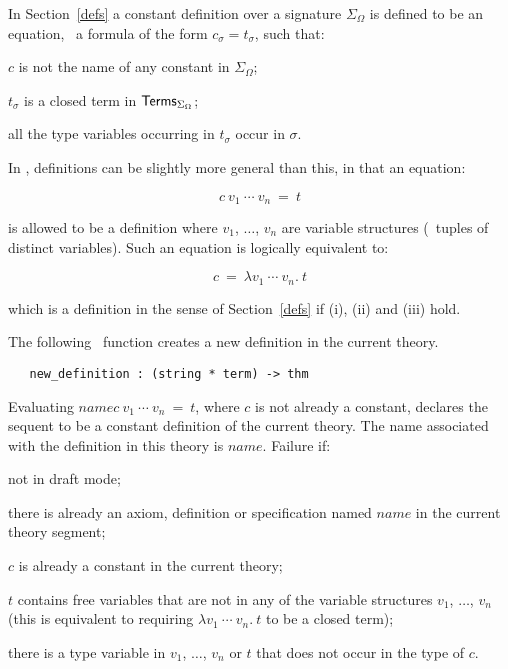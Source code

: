 In Section~\ref{defs} a constant definition
over a signature $\Sigma_{\Omega}$ is defined to be
an equation, \ie\ a formula of the form $c_{\sigma}=t_{\sigma}$,
such that:
\begin{myenumerate}
\item $c$ is not the name of any constant in $\Sigma_{\Omega}$;
\item $t_{\sigma}$ is a closed term in ${\sf Terms}_{\Sigma_{\Omega}}$;
\item all the type variables occurring in $t_{\sigma}$ occur in $\sigma$.
\end{myenumerate}

In \HOL, definitions can be slightly more general than this, in that
an equation:

\[ c\ v_1\ \cdots\ v_n\ =\ t \]

\noindent is  allowed  to  be a  definition where  $v_1$, $\dots$, $v_n$ are
variable structures (\ie\ tuples of distinct variables).   Such  an equation is
logically equivalent to:

\[ c\ =\ \lambda v_1\ \cdots\ v_n.\  t \]

\noindent which is a definition in the sense of  Section~\ref{defs} if (i),
(ii) and (iii) hold.

The following  \ML\ function  creates a  new definition in
the current theory.

\begin{boxed}
\begin{verbatim}
   new_definition : (string * term) -> thm
\end{verbatim}\end{boxed}


\noindent Evaluating
 $name$$c\ v_1\ \cdots\ v_n\ =\ t$,
where $c$ is not already a constant, declares the sequent
 to be a constant definition
of the current theory. The name associated with the definition in
this theory is $name$.
Failure if:
\begin{myenumerate}
\item not in draft mode;
\item there is already an axiom, definition or specification
named $name$ in the current theory segment;
\item $c$ is already a constant in the current theory;
\item $t$ contains free variables that are not in any of
the variable structures $v_1$, $\dots$, $v_n$ (this is equivalent
to requiring $\lambda v_1\ \cdots\ v_n.\  t$ to be a closed term);
\item there is a type variable in  $v_1$, $\dots$, $v_n$ or $t$
that does not occur in the type of $c$.
\end{myenumerate}

